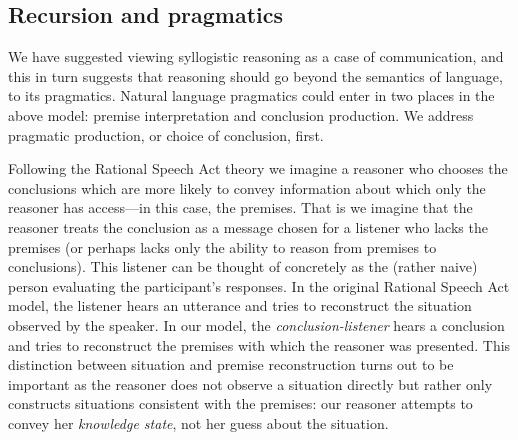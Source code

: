 \documentclass[10pt,letterpaper]{article}
\begin{document}
%
%  
%  


\subsection{Recursion and pragmatics}
We have suggested viewing syllogistic reasoning as a case of communication, and this in turn suggests that reasoning should go beyond the semantics of language, to its pragmatics.
Natural language pragmatics could enter in two places in the above model: premise interpretation and conclusion production. 
We address pragmatic production, or choice of conclusion, first.

Following the Rational Speech Act theory \cite{Goodman2013,Frank2012a} we imagine a reasoner who chooses the conclusions which are more likely to convey information about which only the reasoner has access---in this case, the premises. That is we imagine that the reasoner treats the conclusion as a message chosen for a listener who lacks the premises (or perhaps lacks only the ability to reason from premises to conclusions).
This listener can be thought of concretely as the (rather naive) person evaluating the participant's responses. In the original Rational Speech Act model, the listener hears an utterance and tries to reconstruct the situation observed by the speaker. In our model, the \emph{conclusion-listener} hears a conclusion and tries to reconstruct the premises with which the reasoner was presented. This distinction between situation and premise reconstruction turns out to be important as the reasoner does not observe a situation directly but rather only constructs situations consistent with the premises: our reasoner attempts to convey her \emph{knowledge state}, not her guess about the situation.
\end{document}
